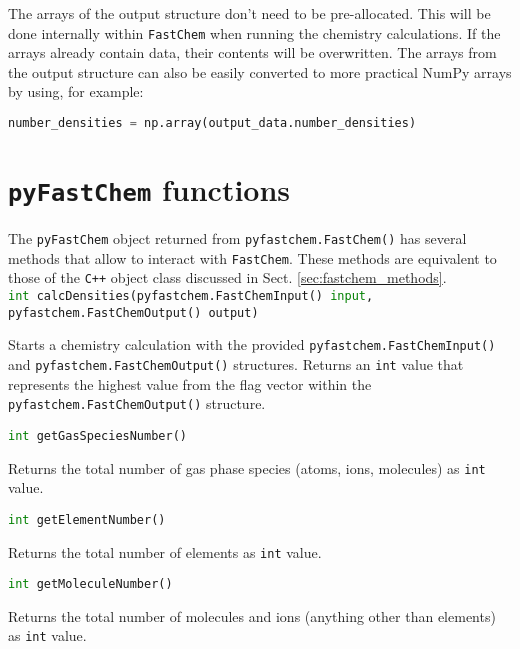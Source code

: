 \documentclass[numbers=noenddot]{aux/fcmanual}
\newcommand{\fc}{\texttt{FastChem}\xspace}
\newcommand{\pfc}{\texttt{pyFastChem}\xspace}
\newcommand{\cpp}{\ttt{C++}\xspace}
\newcommand{\ttt}[1]{\texttt {#1}}
\begin{document}
The arrays of the output structure don't need to be pre-allocated. This will be done internally within \fc when running the chemistry calculations. If the arrays already contain data, their contents will be overwritten. The arrays from the output structure can also be easily converted to more practical NumPy arrays by using, for example:
\begin{lstlisting}[language=Python]
  number_densities = np.array(output_data.number_densities)
\end{lstlisting} 


\section{\pfc functions}
\label{sec:pfc_methods}

The \pfc object returned from \lstinline[language=Python]!pyfastchem.FastChem()! has several methods that allow to interact with \fc. These methods are equivalent to those of the \cpp object class discussed in Sect. \ref{sec:fastchem_methods}.\\

\lstinline[language=Python]!int calcDensities(pyfastchem.FastChemInput() input, pyfastchem.FastChemOutput() output)!
\begin{addmargin}[25pt]{0pt}
	Starts a chemistry calculation with the provided \lstinline!pyfastchem.FastChemInput()! and \lstinline!pyfastchem.FastChemOutput()! structures. Returns an \lstinline!int! value that represents the highest value from the flag vector within the \lstinline!pyfastchem.FastChemOutput()! structure.
\end{addmargin}

\bigbreak

\lstinline[language=Python]!int getGasSpeciesNumber()!
\begin{addmargin}[25pt]{0pt}
	Returns the total number of gas phase species (atoms, ions, molecules) as \lstinline!int! value.
\end{addmargin}

\bigbreak

\lstinline[language=Python]!int getElementNumber()!
\begin{addmargin}[25pt]{0pt}
	Returns the total number of elements as \lstinline!int! value.
\end{addmargin}

\bigbreak

\lstinline[language=Python]!int getMoleculeNumber()!
\begin{addmargin}[25pt]{0pt}
	Returns the total number of molecules and ions (anything other than elements) as \lstinline!int! value.
\end{addmargin}
\end{document}
